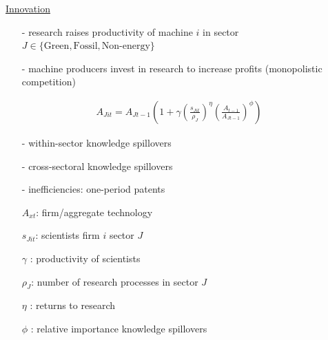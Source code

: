 \documentclass[11pt,aspectratio=169]{beamer}
\begin{document}
\addtocounter{framenumber}{-1}
\begin{frame}{\hyperlink{modma}{Innovation}}
	\vspace{-2mm}
	\begin{itemize}
		\item[-] research raises productivity of machine $i$ in sector $J\in\{\text{Green},\text{Fossil},\text{Non-energy}\}$ \vspace{-1mm}
		\item[-] machine producers invest in research to increase profits \small{(monopolistic competition)}
		\vspace{-1mm}
		\normalsize
	\end{itemize}
	\vspace{-1.4mm}
	\large
	\begin{align*}
		A_{Jit}={A_{Jt-1}}\left(1+\gamma{\left(\frac{s_{Jit}}{\rho_J}\right)^{\eta}}\left(\frac{A_{t-1}}{A_{Jt-1}}\right)^\phi\right)
	\end{align*}
	\normalsize
	\vspace{-1.9mm}
	\begin{enumerate}
		\item[-] within-sector knowledge spillovers \vspace{-1mm}
		\item[-]  {cross-sectoral knowledge spillovers} \vspace{-1mm}
		\item[-] \alert{inefficiencies: one-period patents}
	\end{enumerate}
	\small
	\vspace{4mm}
	\hspace{-2mm}
	\begin{minipage}[t!]{0.43\textwidth}
		\vspace{0mm}
		\begin{itemize}
			\item[] $A_{xt}$: firm/aggregate technology
			\vspace{-2mm}		
			\item[] $s_{Jit}$: scientists firm $i$ sector $J$
			\vspace{-2mm}
			\item[] $\gamma$ : productivity of scientists
		\end{itemize}
	\end{minipage}
	\vspace{-5mm}
	\begin{minipage}[t!]{0.55\textwidth}
		\vspace{0mm}
		\begin{itemize}	
			\item[] {$\rho_J$: number of research processes in sector $J$}
			\vspace{-2mm}			
			\item[] $\eta$ : returns to research
			\vspace{-2mm}			
			\item[] $\phi$ : relative importance knowledge spillovers
		\end{itemize}
	\end{minipage}
\end{frame}
\end{document}
